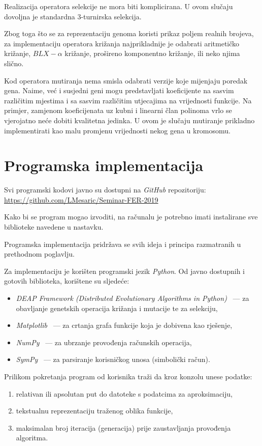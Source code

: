 \documentclass[times, utf8, seminar, numeric]{fer}
\begin{document}
Realizacija operatora selekcije ne mora biti komplicirana.
U ovom slučaju dovoljna je standardna $3$-turnirska selekcija.

Zbog toga što se za reprezentaciju genoma koristi prikaz poljem realnih brojeva, za implementaciju operatora križanja najprikladnije je odabrati aritmetičko križanje, $BLX-\alpha$ križanje, prošireno komponentno križanje, ili neko njima slično.

Kod operatora mutiranja nema smisla odabrati verzije koje mijenjaju poredak gena.
Naime, već i susjedni geni mogu predstavljati koeficijente na sasvim različitim mjestima i sa sasvim različitim utjecajima na vrijednosti funkcije. 
Na primjer, zamjenom koeficijenata uz kubni i linearni član polinoma vrlo se vjerojatno neće dobiti kvalitetna jedinka.
U ovom je slučaju mutiranje prikladno implementirati kao malu promjenu vrijednosti nekog gena u kromosomu.


\chapter{Programska implementacija}

Svi programski kodovi javno su dostupni na \textit{GitHub} repozitoriju:\\
\url{https://github.com/LMesaric/Seminar-FER-2019}

Kako bi se program mogao izvoditi, na računalu je potrebno imati instalirane sve biblioteke navedene u nastavku.

Programska implementacija pridržava se svih ideja i principa razmatranih u prethodnom poglavlju.

Za implementaciju je korišten programski jezik \textit{Python}.
Od javno dostupnih i gotovih biblioteka, korištene su sljedeće:
\begin{itemize}
	\item \textit{DEAP Framework (Distributed Evolutionary Algorithms in Python)}~\cite{Deap} --- za obavljanje genetskih operacija križanja i mutacije te za selekciju,
	\item \textit{Matplotlib}~\cite{Matplotlib} --- za crtanja grafa funkcije koja je dobivena kao rješenje,
	\item \textit{NumPy}~\cite{Numpy} --- za ubrzanje provođenja računskih operacija,
	\item \textit{SymPy}~\cite{Sympy} --- za parsiranje korisničkog unosa (simbolički račun).
\end{itemize}
\bigskip

Prilikom pokretanja program od korisnika traži da kroz konzolu unese podatke: 
\begin{enumerate}
	\item relativan ili apsolutan put do datoteke s podatcima za aproksimaciju,
	\vspace{-2mm}
	\item tekstualnu reprezentaciju traženog oblika funkcije,
	\vspace{-2mm}
	\item maksimalan broj iteracija (generacija) prije zaustavljanja provođenja algoritma.
\end{enumerate}
\end{document}
